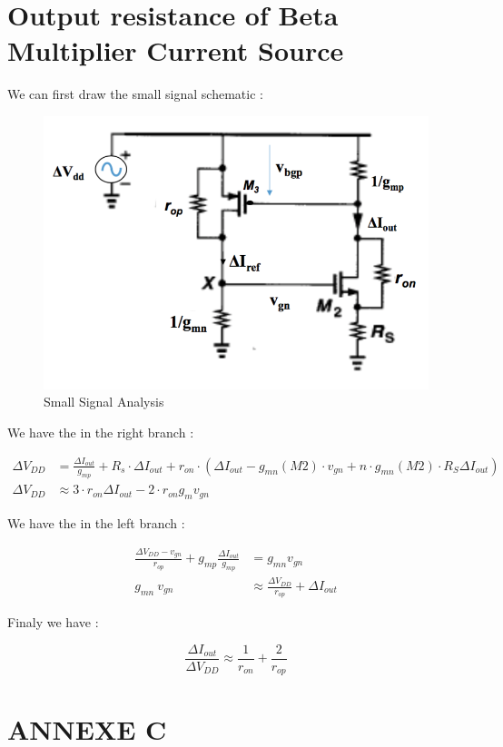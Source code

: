 \chapter{Output resistance of Beta Multiplier Current Source}

We can first draw the small signal schematic :

\begin{figure}[h]
  \begin{center}
    \includegraphics[scale=0.25]{photo/small_sig_bm}
  \end{center}
  \caption{Small Signal Analysis}
  \label{deltaiout}
\end{figure}

We have the in the right branch :

\begin{align}
  \Delta V_{DD} & = \frac{\Delta I_{out}}{g_{mp}} + R_s\cdot \Delta I_{out} + r_{on}\cdot ( \Delta I_{out} - g_{mn}(M2)\cdot v_{gn} + n \cdot g_{mn}(M2) \cdot R_S \Delta I_{out}  ) \\ 
  \Delta V_{DD} & \approx 3 \cdot r_{on} \Delta I_{out} - 2 \cdot r_{on} g_m v_{gn} 
\end{align}

We have the in the left branch :

\begin{align}
  \frac{\Delta V_{DD} - v_{gn}}{r_{op}} + g_{mp} \frac{\Delta I_{out}}{g_{mp}} & = g_{mn} v_{gn} \\ 
  g_{mn}~v_{gn} & \approx \frac{\Delta V_{DD}}{r_{op}} + \Delta I_{out}  
\end{align}

Finaly we have :

\begin{equation}
  \frac{\Delta I_{out}}{\Delta V_{DD}} \approx \frac{1}{r_{on}} + \frac{2}{r_{op}}
\end{equation}



\chapter{ ANNEXE C}